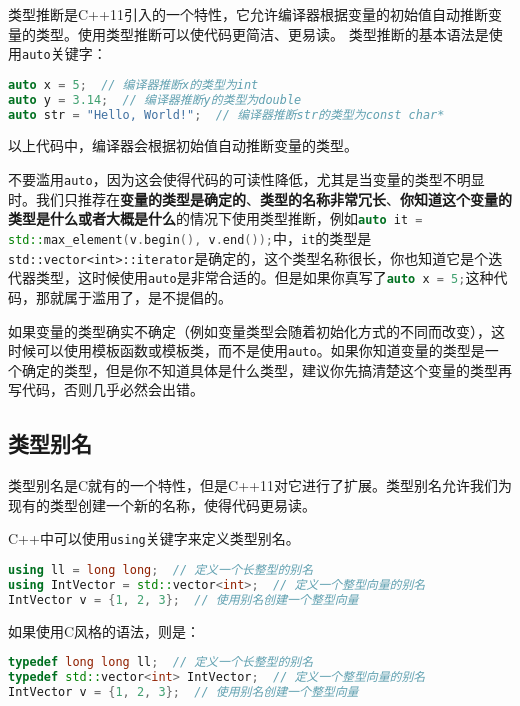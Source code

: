 类型推断是C++11引入的一个特性，它允许编译器根据变量的初始值自动推断变量的类型。使用类型推断可以使代码更简洁、更易读。
类型推断的基本语法是使用\texttt{auto}关键字：
\begin{lstlisting}[language=C++]
auto x = 5;  // 编译器推断x的类型为int
auto y = 3.14;  // 编译器推断y的类型为double
auto str = "Hello, World!";  // 编译器推断str的类型为const char*
\end{lstlisting}
以上代码中，编译器会根据初始值自动推断变量的类型。

\begin{caution}
    不要滥用\texttt{auto}，因为这会使得代码的可读性降低，尤其是当变量的类型不明显时。我们只推荐在\textbf{变量的类型是确定的}、\textbf{类型的名称非常冗长}、\textbf{你知道这个变量的类型是什么或者大概是什么}的情况下使用类型推断，例如\lstinline[language=C++]|auto it = std::max_element(v.begin(), v.end());|中，\texttt{it}的类型是\texttt{std::vector<int>::iterator}是确定的，这个类型名称很长，你也知道它是个迭代器类型，这时候使用\texttt{auto}是非常合适的。但是如果你真写了\lstinline[language=C++]|auto x = 5;|这种代码，那就属于滥用了，是不提倡的。

    如果变量的类型确实不确定（例如变量类型会随着初始化方式的不同而改变），这时候可以使用模板函数或模板类，而不是使用\texttt{auto}。如果你知道变量的类型是一个确定的类型，但是你不知道具体是什么类型，建议你先搞清楚这个变量的类型再写代码，否则几乎必然会出错。
\end{caution}

\subsection{类型别名}

类型别名是C就有的一个特性，但是C++11对它进行了扩展。类型别名允许我们为现有的类型创建一个新的名称，使得代码更易读。

C++中可以使用\texttt{using}关键字来定义类型别名。
\begin{lstlisting}[language=C++]
using ll = long long;  // 定义一个长整型的别名
using IntVector = std::vector<int>;  // 定义一个整型向量的别名
IntVector v = {1, 2, 3};  // 使用别名创建一个整型向量
\end{lstlisting}

如果使用C风格的语法，则是：
\begin{lstlisting}[language=C++]
typedef long long ll;  // 定义一个长整型的别名
typedef std::vector<int> IntVector;  // 定义一个整型向量的别名
IntVector v = {1, 2, 3};  // 使用别名创建一个整型向量
\end{lstlisting}

